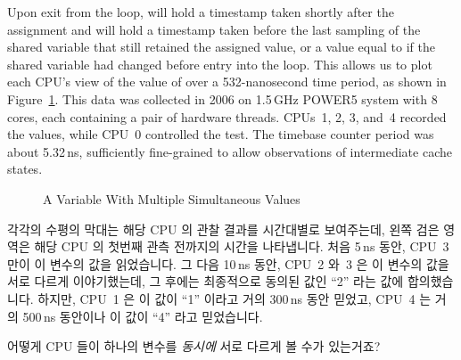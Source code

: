 Upon exit from the loop,  will hold a timestamp
taken shortly after the assignment and  will hold
a timestamp taken before the last sampling of the shared variable
that still retained the assigned value, or a value equal to 
if the shared variable had changed before entry into the loop.
This allows us to plot each CPU's view of the value of 
over a 532-nanosecond time period, as shown in
Figure~\ref{fig:memorder:A Variable With Multiple Simultaneous Values}.
This data was collected in 2006 on 1.5\,GHz POWER5 system with 8 cores,
each containing a pair of hardware threads.
CPUs~1, 2, 3, and~4 recorded the values, while CPU~0 controlled the test.
The timebase counter period was about 5.32\,ns, sufficiently fine-grained
to allow observations of intermediate cache states.
\fi

\begin{figure}[htb]
\centering
{}
\caption{A Variable With Multiple Simultaneous Values}
\label{fig:memorder:A Variable With Multiple Simultaneous Values}
\end{figure}

각각의 수평의 막대는 해당 CPU 의 관찰 결과를 시간대별로 보여주는데, 왼쪽 검은
영역은 해당 CPU 의 첫번째 관측 전까지의 시간을 나타냅니다.
처음 5\,ns 동안, CPU~3 만이 이 변수의 값을 읽었습니다.
그 다음 10\,ns 동안, CPU~2 와~3 은 이 변수의 값을 서로 다르게 이야기했는데, 그
후에는 최종적으로 동의된 값인 ``2'' 라는 값에 합의했습니다.
하지만, CPU~1 은 이 값이 ``1'' 이라고 거의 300\,ns 동안 믿었고, CPU~4 는 거의
500\,ns 동안이나 이 값이 ``4'' 라고 믿었습니다.

\QuickQuiz{}
	어떻게 CPU 들이 하나의 변수를 \emph{동시에} 서로 다르게 볼 수가
	있는거죠?
	\iffalse

